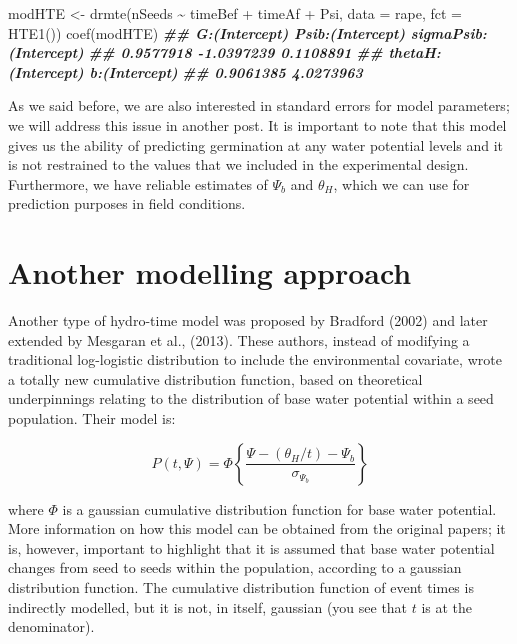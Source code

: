 \documentclass[
]{book}
\newenvironment{Shaded}{\begin{snugshade}}{\end{snugshade}}
\newcommand{\AttributeTok}[1]{\textcolor[rgb]{0.77,0.63,0.00}{#1}}
\newcommand{\DocumentationTok}[1]{\textcolor[rgb]{0.56,0.35,0.01}{\textbf{\textit{#1}}}}
\newcommand{\FunctionTok}[1]{\textcolor[rgb]{0.00,0.00,0.00}{#1}}
\newcommand{\NormalTok}[1]{#1}
\newcommand{\OtherTok}[1]{\textcolor[rgb]{0.56,0.35,0.01}{#1}}
\newcommand{\SpecialCharTok}[1]{\textcolor[rgb]{0.00,0.00,0.00}{#1}}
\begin{document}
\begin{Shaded}
\begin{Highlighting}[]
\NormalTok{modHTE }\OtherTok{\textless{}{-}} \FunctionTok{drmte}\NormalTok{(nSeeds }\SpecialCharTok{\textasciitilde{}}\NormalTok{ timeBef }\SpecialCharTok{+}\NormalTok{ timeAf }\SpecialCharTok{+}\NormalTok{ Psi, }
                \AttributeTok{data =}\NormalTok{ rape, }\AttributeTok{fct =} \FunctionTok{HTE1}\NormalTok{())}
\FunctionTok{coef}\NormalTok{(modHTE)}
\DocumentationTok{\#\#         G:(Intercept)      Psib:(Intercept) sigmaPsib:(Intercept) }
\DocumentationTok{\#\#             0.9577918            {-}1.0397239             0.1108891 }
\DocumentationTok{\#\#    thetaH:(Intercept)         b:(Intercept) }
\DocumentationTok{\#\#             0.9061385             4.0273963}
\end{Highlighting}
\end{Shaded}

As we said before, we are also interested in standard errors for model parameters; we will address this issue in another post. It is important to note that this model gives us the ability of predicting germination at any water potential levels and it is not restrained to the values that we included in the experimental design. Furthermore, we have reliable estimates of \(\Psi_{b}\) and \(\theta_H\), which we can use for prediction purposes in field conditions.

\hypertarget{another-modelling-approach}{%
\section{Another modelling approach}\label{another-modelling-approach}}

Another type of hydro-time model was proposed by Bradford (2002) and later extended by Mesgaran et al., (2013). These authors, instead of modifying a traditional log-logistic distribution to include the environmental covariate, wrote a totally new cumulative distribution function, based on theoretical underpinnings relating to the distribution of base water potential within a seed population. Their model is:

\[ P(t, \Psi) = \Phi \left\{ \frac{\Psi - (\theta_H / t) -\Psi_b }{\sigma_{\Psi_b}} \right\}\]

where \(\Phi\) is a gaussian cumulative distribution function for base water potential. More information on how this model can be obtained from the original papers; it is, however, important to highlight that it is assumed that base water potential changes from seed to seeds within the population, according to a gaussian distribution function. The cumulative distribution function of event times is indirectly modelled, but it is not, in itself, gaussian (you see that \(t\) is at the denominator).
\end{document}
